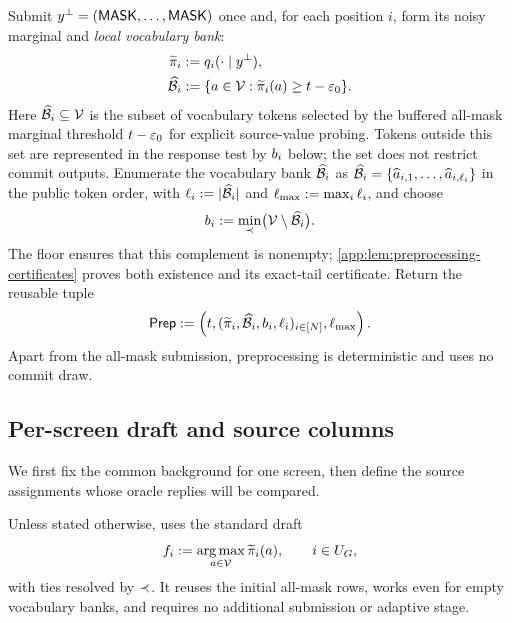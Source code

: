 \begin{definition}
Submit $y^\perp=(\mathsf{MASK},\ldots,\mathsf{MASK})$ once and, for each position $i$,
form its noisy marginal and \emph{local vocabulary bank}:
\begin{align}
 \widetilde\pi_{i}&:=q_{i}(\cdot\mid y^\perp),
 \label{app:eq:noisy-marginal}\\
 \widehat{\mathcal B}_{i}
 &:=\{a\in\mathcal V:\widetilde\pi_{i}(a)\ge t-\varepsilon_0\}.
 \label{app:eq:local-bank}
\end{align}
Here $\widehat{\mathcal B}_{i}\subseteq\mathcal V$ is the subset of vocabulary tokens
selected by the buffered all-mask marginal threshold
$t-\varepsilon_0$ for explicit source-value probing.
Tokens outside this set are represented in the response test by
$b_{i}$ below; the set does not restrict commit outputs.
Enumerate the vocabulary bank $\widehat{\mathcal B}_{i}$ as
$\widehat{\mathcal B}_{i}=\{\widehat a_{i,1},\ldots,\widehat a_{i,\ell_{i}}\}$
in the public token order, with $\ell_{i}:=|\widehat{\mathcal B}_{i}|$ and
$\ell_{\max}:=\max_i\ell_{i}$, and choose
\begin{equation}
 b_{i}:=
 \min_{\prec}\bigl(\mathcal V\setminus\widehat{\mathcal B}_{i}\bigr).
 \label{app:eq:positionwise-baseline}
\end{equation}
The floor ensures that this complement is nonempty;
\cref{app:lem:preprocessing-certificates} proves both existence and its
exact-tail certificate.  Return the reusable tuple
\begin{equation}
 \mathsf{Prep}:=
 \left(t,
 (\widetilde\pi_{i},\widehat{\mathcal B}_{i},b_{i},\ell_{i})_{i\in[N]},
 \ell_{\max}\right).
 \label{app:eq:preprocessing-output}
\end{equation}
Apart from the all-mask submission, preprocessing is deterministic and uses
no commit draw.
\end{definition}

\subsection{Per-screen draft and source columns}
\label{app:algorithm-draft}

We first fix the common background for one screen, then define the source
assignments whose oracle replies will be compared.

\begin{example*}
Unless stated otherwise,  uses the standard draft
\begin{equation}
 f_{i}
 :=\mathop{\arg\max}_{a\in\mathcal V}\widetilde\pi_{i}(a),
 \qquad i\in U_{G},
 \label{app:eq:standard-draft}
\end{equation}
with ties resolved by $\prec$.  It reuses the initial all-mask rows,
works even for empty vocabulary banks, and requires no additional submission or adaptive
stage.
\end{example*}

